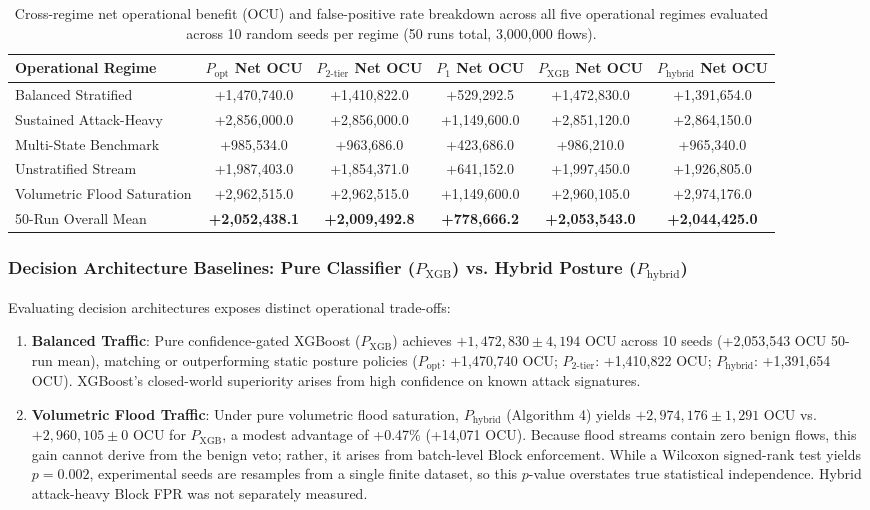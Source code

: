 \documentclass[journal,10pt,onecolumn]{IEEEtran}
\begin{document}
\begin{table}[t]
\caption{Cross-regime net operational benefit (OCU) and false-positive rate breakdown across all five operational regimes evaluated across 10 random seeds per regime (50 runs total, 3,000,000 flows).}
\label{tab:per_regime_breakdown}
\centering
\small
\begin{tabular}{lccccc}
\toprule
\textbf{Operational Regime} & \textbf{$P_{\text{opt}}$ Net OCU} & \textbf{$P_{2\text{-tier}}$ Net OCU} & \textbf{$P_1$ Net OCU} & \textbf{$P_{\text{XGB}}$ Net OCU} & \textbf{$P_{\text{hybrid}}$ Net OCU} \\
\midrule
Balanced Stratified & +1,470,740.0 & +1,410,822.0 & +529,292.5 & +1,472,830.0 & +1,391,654.0 \\
Sustained Attack-Heavy & +2,856,000.0 & +2,856,000.0 & +1,149,600.0 & +2,851,120.0 & +2,864,150.0 \\
Multi-State Benchmark & +985,534.0 & +963,686.0 & +423,686.0 & +986,210.0 & +965,340.0 \\
Unstratified Stream & +1,987,403.0 & +1,854,371.0 & +641,152.0 & +1,997,450.0 & +1,926,805.0 \\
Volumetric Flood Saturation & +2,962,515.0 & +2,962,515.0 & +1,149,600.0 & +2,960,105.0 & +2,974,176.0 \\
\midrule
50-Run Overall Mean & \textbf{+2,052,438.1} & \textbf{+2,009,492.8} & \textbf{+778,666.2} & \textbf{+2,053,543.0} & \textbf{+2,044,425.0} \\
\bottomrule
\end{tabular}
\end{table}

\subsubsection{Decision Architecture Baselines: Pure Classifier ($P_{\text{XGB}}$) vs. Hybrid Posture ($P_{\text{hybrid}}$)}
Evaluating decision architectures exposes distinct operational trade-offs:
\begin{enumerate}
    \item \textbf{Balanced Traffic}: Pure confidence-gated XGBoost ($P_{\text{XGB}}$) achieves $+1,472,830 \pm 4,194$ OCU across 10 seeds (+2,053,543 OCU 50-run mean), matching or outperforming static posture policies ($P_{\text{opt}}$: +1,470,740 OCU; $P_{2\text{-tier}}$: +1,410,822 OCU; $P_{\text{hybrid}}$: +1,391,654 OCU). XGBoost's closed-world superiority arises from high confidence on known attack signatures.
    \item \textbf{Volumetric Flood Traffic}: Under pure volumetric flood saturation, $P_{\text{hybrid}}$ (Algorithm 4) yields $+2,974,176 \pm 1,291$ OCU vs. $+2,960,105 \pm 0$ OCU for $P_{\text{XGB}}$, a modest advantage of +0.47\% (+14,071 OCU). Because flood streams contain zero benign flows, this gain cannot derive from the benign veto; rather, it arises from batch-level Block enforcement. While a Wilcoxon signed-rank test yields $p = 0.002$, experimental seeds are resamples from a single finite dataset, so this $p$-value overstates true statistical independence. Hybrid attack-heavy Block FPR was not separately measured.
\end{enumerate}
\end{document}
